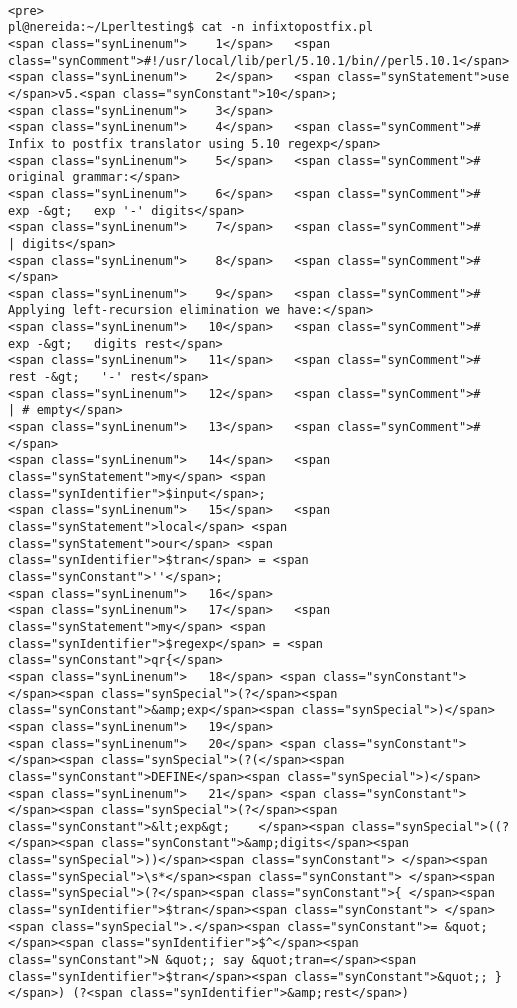 \begin{verbatim}

<pre>
pl@nereida:~/Lperltesting$ cat -n infixtopostfix.pl
<span class="synLinenum">    1</span>   <span class="synComment">#!/usr/local/lib/perl/5.10.1/bin//perl5.10.1</span>
<span class="synLinenum">    2</span>   <span class="synStatement">use </span>v5.<span class="synConstant">10</span>;
<span class="synLinenum">    3</span> 
<span class="synLinenum">    4</span>   <span class="synComment"># Infix to postfix translator using 5.10 regexp</span>
<span class="synLinenum">    5</span>   <span class="synComment"># original grammar:</span>
<span class="synLinenum">    6</span>   <span class="synComment">#  exp -&gt;   exp '-' digits</span>
<span class="synLinenum">    7</span>   <span class="synComment">#         | digits</span>
<span class="synLinenum">    8</span>   <span class="synComment">#</span>
<span class="synLinenum">    9</span>   <span class="synComment"># Applying left-recursion elimination we have:</span>
<span class="synLinenum">   10</span>   <span class="synComment">#  exp -&gt;   digits rest</span>
<span class="synLinenum">   11</span>   <span class="synComment">#  rest -&gt;   '-' rest</span>
<span class="synLinenum">   12</span>   <span class="synComment">#          | # empty</span>
<span class="synLinenum">   13</span>   <span class="synComment">#</span>
<span class="synLinenum">   14</span>   <span class="synStatement">my</span> <span class="synIdentifier">$input</span>;
<span class="synLinenum">   15</span>   <span class="synStatement">local</span> <span class="synStatement">our</span> <span class="synIdentifier">$tran</span> = <span class="synConstant">''</span>;
<span class="synLinenum">   16</span> 
<span class="synLinenum">   17</span>   <span class="synStatement">my</span> <span class="synIdentifier">$regexp</span> = <span class="synConstant">qr{</span>
<span class="synLinenum">   18</span> <span class="synConstant">      </span><span class="synSpecial">(?</span><span class="synConstant">&amp;exp</span><span class="synSpecial">)</span>
<span class="synLinenum">   19</span> 
<span class="synLinenum">   20</span> <span class="synConstant">      </span><span class="synSpecial">(?(</span><span class="synConstant">DEFINE</span><span class="synSpecial">)</span>
<span class="synLinenum">   21</span> <span class="synConstant">          </span><span class="synSpecial">(?</span><span class="synConstant">&lt;exp&gt;    </span><span class="synSpecial">((?</span><span class="synConstant">&amp;digits</span><span class="synSpecial">))</span><span class="synConstant"> </span><span class="synSpecial">\s*</span><span class="synConstant"> </span><span class="synSpecial">(?</span><span class="synConstant">{ </span><span class="synIdentifier">$tran</span><span class="synConstant"> </span><span class="synSpecial">.</span><span class="synConstant">= &quot;</span><span class="synIdentifier">$^</span><span class="synConstant">N &quot;; say &quot;tran=</span><span class="synIdentifier">$tran</span><span class="synConstant">&quot;; }</span>) (?<span class="synIdentifier">&amp;rest</span>)

\end{verbatim}
